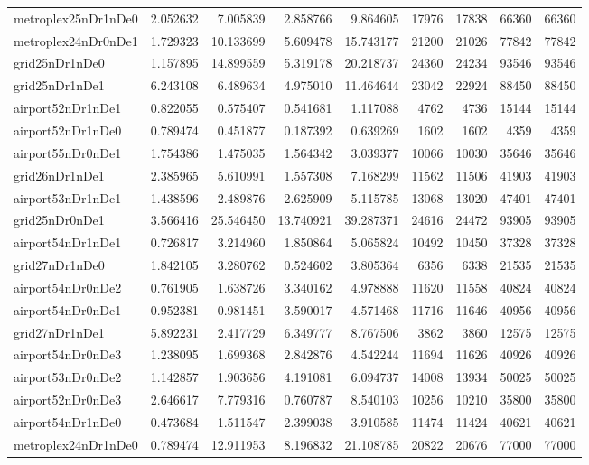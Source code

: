 \begin{longtable}{|l|r|r|r|r|r|r|r|r|}
metroplex25nDr1nDe0 & 2.052632 & 7.005839 & 2.858766 & 9.864605 & 17976 & 17838 & 66360 & 66360 \\
metroplex24nDr0nDe1 & 1.729323 & 10.133699 & 5.609478 & 15.743177 & 21200 & 21026 & 77842 & 77842 \\
grid25nDr1nDe0 & 1.157895 & 14.899559 & 5.319178 & 20.218737 & 24360 & 24234 & 93546 & 93546 \\
grid25nDr1nDe1 & 6.243108 & 6.489634 & 4.975010 & 11.464644 & 23042 & 22924 & 88450 & 88450 \\
airport52nDr1nDe1 & 0.822055 & 0.575407 & 0.541681 & 1.117088 & 4762 & 4736 & 15144 & 15144 \\
airport52nDr1nDe0 & 0.789474 & 0.451877 & 0.187392 & 0.639269 & 1602 & 1602 & 4359 & 4359 \\
airport55nDr0nDe1 & 1.754386 & 1.475035 & 1.564342 & 3.039377 & 10066 & 10030 & 35646 & 35646 \\
grid26nDr1nDe1 & 2.385965 & 5.610991 & 1.557308 & 7.168299 & 11562 & 11506 & 41903 & 41903 \\
airport53nDr1nDe1 & 1.438596 & 2.489876 & 2.625909 & 5.115785 & 13068 & 13020 & 47401 & 47401 \\
grid25nDr0nDe1 & 3.566416 & 25.546450 & 13.740921 & 39.287371 & 24616 & 24472 & 93905 & 93905 \\
airport54nDr1nDe1 & 0.726817 & 3.214960 & 1.850864 & 5.065824 & 10492 & 10450 & 37328 & 37328 \\
grid27nDr1nDe0 & 1.842105 & 3.280762 & 0.524602 & 3.805364 & 6356 & 6338 & 21535 & 21535 \\
airport54nDr0nDe2 & 0.761905 & 1.638726 & 3.340162 & 4.978888 & 11620 & 11558 & 40824 & 40824 \\
airport54nDr0nDe1 & 0.952381 & 0.981451 & 3.590017 & 4.571468 & 11716 & 11646 & 40956 & 40956 \\
grid27nDr1nDe1 & 5.892231 & 2.417729 & 6.349777 & 8.767506 & 3862 & 3860 & 12575 & 12575 \\
airport54nDr0nDe3 & 1.238095 & 1.699368 & 2.842876 & 4.542244 & 11694 & 11626 & 40926 & 40926 \\
airport53nDr0nDe2 & 1.142857 & 1.903656 & 4.191081 & 6.094737 & 14008 & 13934 & 50025 & 50025 \\
airport52nDr0nDe3 & 2.646617 & 7.779316 & 0.760787 & 8.540103 & 10256 & 10210 & 35800 & 35800 \\
airport54nDr1nDe0 & 0.473684 & 1.511547 & 2.399038 & 3.910585 & 11474 & 11424 & 40621 & 40621 \\
metroplex24nDr1nDe0 & 0.789474 & 12.911953 & 8.196832 & 21.108785 & 20822 & 20676 & 77000 & 77000 \\

\end{longtable}

